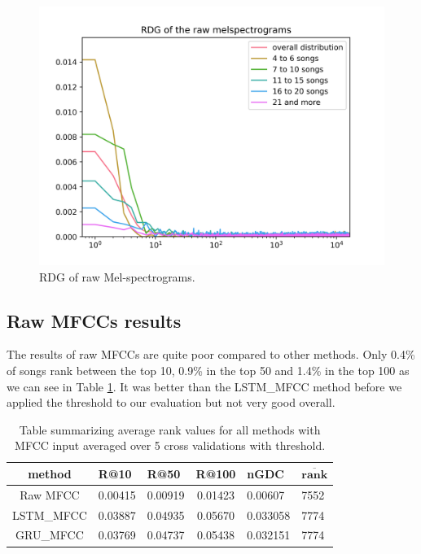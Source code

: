 \begin{figure}[H]
    \centering
	\includegraphics[width=120mm]{./img/raw_mel_graph.png}
	\caption{RDG of raw Mel-spectrograms.}
	\label{fig:raw_mel_graph}
\end{figure}

\subsection{Raw MFCCs results}\label{ssec:raw_mfccs_results}

The results of raw MFCCs are quite poor compared to other methods. Only 0.4\% of songs rank between the top 10, 0.9\% in the top 50 and 1.4\% in the top 100 as we can see in Table \ref{table:mfcc_methods}. It was better than the LSTM\_MFCC method before we applied the threshold to our evaluation but not very good overall.
\begin{table}[H]
\centering
\renewcommand{\arraystretch}{1.5}
\begin{tabu} to 1\textwidth { | c || X[c] | X[c] | c | X[c] | X[c] |}
 \hline
 \textbf{method} & \textbf{R@10} & \textbf{R@50} & \textbf{R@100} & \textbf{nGDC} & $ \boldsymbol{\overline{rank}} $ \\
 \hline
 \hline
 Raw MFCC & 0.00415 & 0.00919 & 0.01423 & 0.00607 &  7552 \\
 \hline
 LSTM\_MFCC & 0.03887 & 0.04935 & 0.05670 & 0.033058 & 7774 \\
 \hline
 GRU\_MFCC & 0.03769 & 0.04737 & 0.05438 & 0.032151 & 7774 \\
 \hline
\end{tabu} \\

\caption{Table summarizing average rank values for all methods with MFCC input averaged over 5 cross validations with threshold.}
\label{table:mfcc_methods}
\end{table}


